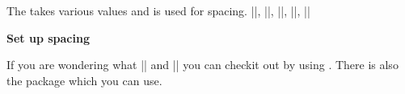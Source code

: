 \begin{teX}
  \long{}
\end{teX}

\noindent The  takes various values and is used for spacing. 
|\bm@l|, |\bm@r|, |\bm@s|, |\bm@t|, |\bm@b|


\textbf{Set up spacing}

\begin{teX}
  \def\bm@c{\hss\unhbox\@tempboxa\hss}
  \def\bm@l{\unhbox\@tempboxa\hss}\let\bm@t\bm@l
  \def\bm@r{\hss\unhbox\@tempboxa}\let\bm@b\bm@r
  \def\bm@s{\unhbox\@tempboxa}
\end{teX}


\noindent If you are wondering what |\@pboxswfalse| and |\@pboxswtrue| you can checkit out by using . There is also the package  which you can use.

\endinput

\makeatletter

\parindent0pt

\def\reflect{\@star@or@long\accommand}
\fboxrule=0.0pt

\long\def\accommand#1{\framebox[4cm][l]{%
     {\tt\string#1 \hfill:}} %
     \parbox[t]{7cm}{\tt\expandafter\strip@prefix\meaning#1}} 


\def\ccommand#1{\parbox[t]{4cm}{\string#1}\parbox[t]{7cm}{#1}}


\reflect{\bm@c}

\reflect{\@pboxswtrue}

\reflect{\@pboxswtrue}

\reflect{\leavevmode}


\meaning\@@par

\meaning\hss

\meaning\ifmmode

\meaning\vbox

\meaning\voidb@x

